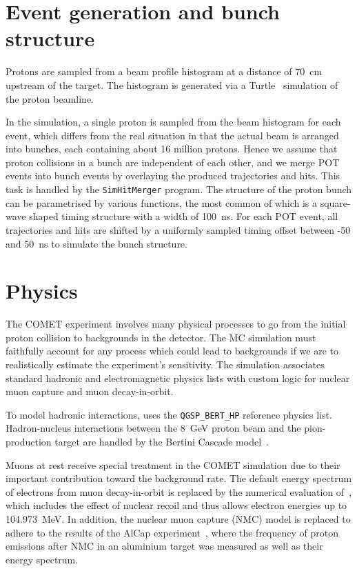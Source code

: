 \section{Event generation and bunch structure}
Protons are sampled from a beam profile histogram at a distance of \SI{70}{\cm} upstream of the target. The histogram is generated via a Turtle~\cite{Carey1974DecayT} simulation of the proton beamline.

In the simulation, a single proton is sampled from the beam histogram for each event, which differs from the real situation in that the actual beam is arranged into bunches, each containing about 16 million protons. Hence we assume that proton collisions in a bunch are independent of each other, and we merge POT events into bunch events by overlaying the produced trajectories and hits. This task is handled by the \texttt{SimHitMerger} program. The structure of the proton bunch can be parametrised by various functions, the most common of which is a square-wave shaped timing structure with a width of \SI{100}{\ns}. For each POT event, all trajectories and hits are shifted by a uniformly sampled timing offset between -50 and \SI{50}{\ns} to simulate the bunch structure. 

\section{Physics}
The COMET experiment involves many physical processes to go from the initial proton collision to backgrounds in the detector.
The MC simulation must faithfully account for any process which could lead to backgrounds if we are to realistically estimate the experiment's sensitivity. The \SimG simulation associates standard \Geant hadronic and electromagnetic physics lists with custom logic for nuclear muon capture and muon decay-in-orbit.

To model hadronic interactions, \SimG uses the \texttt{QGSP\_BERT\_HP} reference physics list. Hadron-nucleus interactions between the \SI{8}{\GeV} proton beam and the pion-production target are handled by the Bertini Cascade model~\cite{WRIGHT2015175}.

Muons at rest receive special treatment in the COMET simulation due to their important contribution toward the background rate. The default energy spectrum of electrons from muon decay-in-orbit is replaced by the numerical evaluation of~\cite{czarnecki}, which includes the effect of nuclear recoil and thus allows electron energies up to \SI{104.973}{\MeV}. In addition, the nuclear muon capture (NMC) model is replaced to adhere to the results of the AlCap experiment~\cite{litchfield2015status}, where the frequency of proton emissions after NMC in an aluminium target was measured as well as their energy spectrum.


